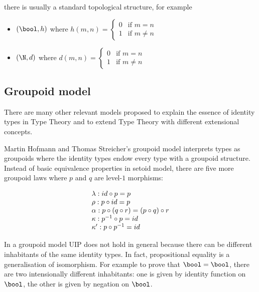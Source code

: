  there is usually a standard topological structure, for example 

\begin{itemize}

\item $(\bool , h)$ where 
$h(m,n) =
\left\{
	\begin{array}{ll}
		0  & \mbox{if } m = n \\
		1 & \mbox{if } m \neq n
	\end{array}
\right.
$

\item $(\N , d)$ where 
$d(m,n) =
\left\{
	\begin{array}{ll}
		0  & \mbox{if } m = n \\
		1 & \mbox{if } m \neq n
	\end{array}
\right.
$
\end{itemize}






\subsection{Groupoid model}

There are many other relevant models proposed to explain the essence of identity types in Type Theory and to extend Type Theory with different extensional concepts. 

Martin Hofmann and Thomas Streicher's \cite{MR1686862} groupoid model interprets types as groupoids where the identity types endow every type with a groupoid structure. Instead of basic equivalence properties in setoid model, there are five more groupoid laws where $p$ and $q$ are level-$1$ morphisms:

\begin{equation*}
\begin{array}[b]{l}
\lambda : id \circ p = p \\
\rho : p \circ id = p \\
\alpha : p \circ (q \circ r) = (p \circ q) \circ r \\
\kappa : p^{-1}\circ p = id \\
\kappa' : p \circ p^{-1} = id
 \end{array}
\end{equation*}

In a groupoid model UIP does not hold in general because there can be different inhabitants of the same identity types. In fact, propositional equality is a generalisation of isomorphism. For example to prove that $\bool = \bool$, there are two intensionally different inhabitants: one is given by identity function on $\bool$, the other is given by negation on $\bool$.



